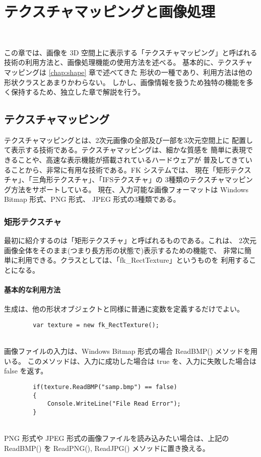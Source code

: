 \chapter{テクスチャマッピングと画像処理} \label{chap:imagetexture} ~

この章では、画像を 3D 空間上に表示する「テクスチャマッピング」と呼ばれる
技術の利用方法と、画像処理機能の使用方法を述べる。
基本的に、テクスチャマッピングは \ref{chap:shape} 章で述べてきた
形状の一種であり、利用方法は他の形状クラスとあまりかわらない。
しかし、画像情報を扱うため独特の機能を多く保持するため、独立した章で解説を行う。

\section{テクスチャマッピング} \label{sec:texture}
テクスチャマッピングとは、2次元画像の全部及び一部を3次元空間上に
配置して表示する技術である。テクスチャマッピングは、細かな質感を
簡単に表現できることや、高速な表示機能が搭載されているハードウェアが
普及してきていることから、非常に有用な技術である。FK システムでは、
現在「矩形テクスチャ」、「三角形テクスチャ」、「IFSテクスチャ」の
3種類のテクスチャマッピング方法をサポートしている。
現在、入力可能な画像フォーマットは Windows Bitmap 形式、PNG 形式、
JPEG 形式の3種類である。

\subsection{矩形テクスチャ}
最初に紹介するのは「矩形テクスチャ」と呼ばれるものである。これは、
2次元画像全体をそのまま(つまり長方形の状態で)表示するための機能で、
非常に簡単に利用できる。クラスとしては、「fk\_RectTexture」というものを
利用することになる。

\subsubsection{基本的な利用方法}
生成は、他の形状オブジェクトと同様に普通に変数を定義するだけでよい。
\\
\begin{screen}
\begin{verbatim}
        var texture = new fk_RectTexture();
\end{verbatim}
\end{screen}
~ \\
画像ファイルの入力は、Windows Bitmap 形式の場合 ReadBMP() メソッドを用いる。
このメソッドは、入力に成功した場合は true を、入力に失敗した場合は false を返す。
\\
\begin{breakbox}
\begin{verbatim}
        if(texture.ReadBMP("samp.bmp") == false)
        {
            Console.WriteLine("File Read Error");
        }
\end{verbatim}
\end{breakbox}
~ \\
PNG 形式や JPEG 形式の画像ファイルを読み込みたい場合は、上記の ReadBMP() を
ReadPNG(), ReadJPG() メソッドに置き換える。

